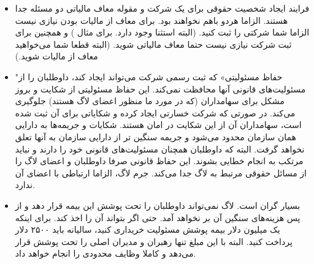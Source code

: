 \begin{itemize}
\item
فرایند ایجاد شخصیت حقوقی برای یک شرکت و مقوله معاف مالیاتی
دو مسئله جدا هستند. الزاما هردو باهم نخواهند بود. برای معاف از مالیات
بودن نیازی نیست الزاما شما شرکتی را ثبت کنید. (البته استثنا وجود دارد.
برای مثال
)
و همچنین برای ثبت شرکت نیازی نیست حتما معاف مالیاتی شوید.
(البته قطعا شما می‌خواهید معاف از مالیات شوید.)

\item
"حفاظ مسئولیتی» که ثبت رسمی شرکت می‌تواند ایجاد کند، داوطلبان را از
مسئولیت‌های قانونی آنها محافظت نمی‌کند. این حفاظ مسئولیتی از شکایت و
بروز مشکل برای سهامداران (که در مورد ما منظور اعضای لاگ هستند) جلوگیری
می‌کند. در صورتی که شرکت خسارتی ایجاد کرده و شکایاتی برای آن ثبت شده است،
سهامداران آن از این شکایت در امان هستند. شکایات و جریمه‌ها به دارایی همان
سازمان محدود می‌شود و جریمه سنگین تر از دارایی سازمان به آنها تعلق نخواهد گرفت.
البته که داوطلبان همچنان مسئولیت‌های قانونی خود را دارند و نباید مرتکب به
انجام خطایی بشوند. این حفاظ قانونی صرفا داوطلبان و اعضای لاگ را از مسائل
حقوقی مرتبط به لاگ جدا می‌کند. جرم لاگ، الزاما ارتباطی با اعضای آن ندارد.

\item

بسیار گران است. لاگ نمی‌تواند داوطلبان را تحت پوشش این بیمه قرار دهد و
از پس هزینه‌های سنگین آن بر نخواهد آمد. حتی اگر بتواند آن را اخذ کند.
برای اینکه یک میلیون دلار بیمه پوشش مسئولیت خریداری کنید، سالیانه باید
۲۵۰۰ دلار پرداخت کنید. البته با این مبلغ تنها رهبران و مدیران اصلی را تحت
پوشش قرار می‌دهد و کاملا وظایف محدودی را انجام خواهد داد.


\end{itemize}
